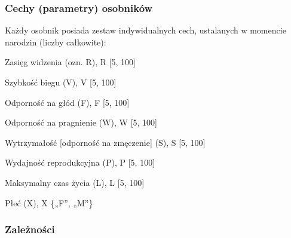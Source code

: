 \subsubsection*{Cechy (parametry) osobników}

Każdy osobnik posiada zestaw indywidualnych cech, ustalanych w momencie narodzin (liczby całkowite)\-:


\begin{DoxyItemize}
\item Zasięg widzenia (ozn. R), R  \mbox{[}5, 100\mbox{]}
\end{DoxyItemize}


\begin{DoxyItemize}
\item Szybkość biegu (V), V  \mbox{[}5, 100\mbox{]}
\end{DoxyItemize}


\begin{DoxyItemize}
\item Odporność na głód (F), F  \mbox{[}5, 100\mbox{]}
\end{DoxyItemize}


\begin{DoxyItemize}
\item Odporność na pragnienie (W), W  \mbox{[}5, 100\mbox{]}
\end{DoxyItemize}


\begin{DoxyItemize}
\item Wytrzymałość \mbox{[}odporność na zmęczenie\mbox{]} (S), S  \mbox{[}5, 100\mbox{]}
\end{DoxyItemize}


\begin{DoxyItemize}
\item Wydajność reprodukcyjna (P), P  \mbox{[}5, 100\mbox{]}
\end{DoxyItemize}


\begin{DoxyItemize}
\item Maksymalny czas życia (L), L  \mbox{[}5, 100\mbox{]}
\end{DoxyItemize}


\begin{DoxyItemize}
\item Płeć (X), X  \{„\-F”, „\-M”\}
\end{DoxyItemize}

\subsubsection*{Zależności}


